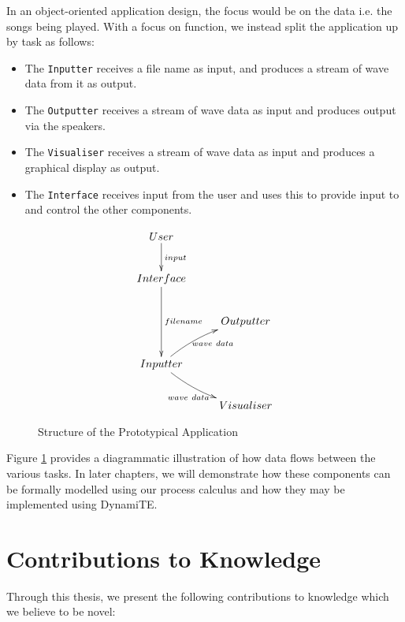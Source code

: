 In an object-oriented application design, the focus would be on the
data i.e. the songs being played.  With a focus on function, we
instead split the application up by task as follows:

\begin{itemize}
\item The \texttt{Inputter} receives a file name as input, and
  produces a stream of wave data from it as output.
\item The \texttt{Outputter} receives a stream of wave data as input
  and produces output via the speakers.
\item The \texttt{Visualiser} receives a stream of wave data as input
  and produces a graphical display as output.
\item The \texttt{Interface} receives input from the user and uses
  this to provide input to and control the other components.
\end{itemize}

\begin{figure}  
  \centering
\[\CompileMatrices
\xymatrix{
User \ar@{->}[d]^{input} \\
Interface \ar@{->}[dd]^{filename} \\ 
& Outputter \\
Inputter \ar@/^/[ur]_{wave\ data} \ar@/_/[dr]_{wave\ data} \\
& Visualiser
}
\]
  \caption{Structure of the Prototypical Application}
  \label{fig:appstructure}
\end{figure}

Figure \ref{fig:appstructure} provides a diagrammatic illustration of
how data flows between the various tasks.  In later chapters, we will
demonstrate how these components can be formally modelled using our
process calculus and how they may be implemented using DynamiTE.

\section{Contributions to Knowledge}
\label{contributions}

Through this thesis, we present the following contributions to
knowledge which we believe to be novel:

